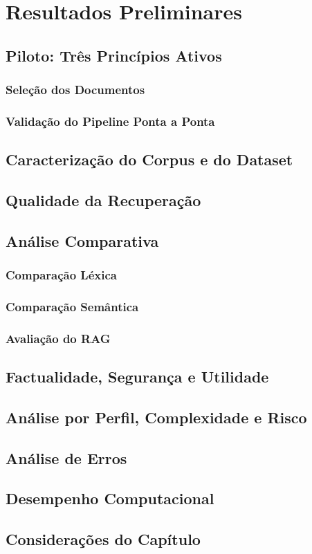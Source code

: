 \chapter{Resultados Preliminares}

\section{Piloto: Três Princípios Ativos}

\subsection{Seleção dos Documentos}

\subsection{Validação do Pipeline Ponta a Ponta}

\section{Caracterização do Corpus e do Dataset}

\section{Qualidade da Recuperação}


\section{Análise Comparativa}

\subsection{Comparação Léxica}

\subsection{Comparação Semântica}

\subsection{Avaliação do RAG}

\section{Factualidade, Segurança e Utilidade}

\section{Análise por Perfil, Complexidade e Risco}

\section{Análise de Erros}

\section{Desempenho Computacional}

\section{Considerações do Capítulo}
